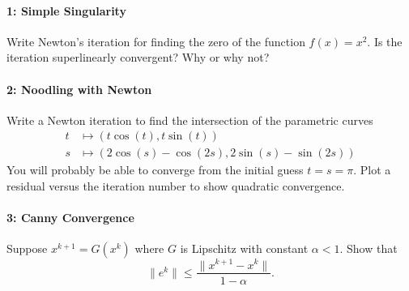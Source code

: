 \documentclass[12pt, leqno]{article}
\begin{document}

\paragraph*{1: Simple Singularity}
Write Newton's iteration for finding the zero of the function $f(x) = x^2$.
Is the iteration superlinearly convergent?  Why or why not?

\paragraph*{2: Noodling with Newton}
Write a Newton iteration to find the intersection of the
parametric curves
\begin{align*}
  t &\mapsto (t \cos(t), t \sin(t)) \\
  s &\mapsto (2 \cos(s) - \cos(2s), 2\sin(s) - \sin(2s))
\end{align*}
You will probably be able to converge from the
initial guess $t = s = \pi$.  Plot a residual versus
the iteration number to show quadratic convergence.

\paragraph*{3: Canny Convergence}
Suppose $x^{k+1} = G(x^k)$ where $G$ is Lipschitz with constant
$\alpha < 1$.  Show that
\[
  \|e^k\| \leq \frac{\|x^{k+1}-x^k\|}{1-\alpha}.
\]
\end{document}
